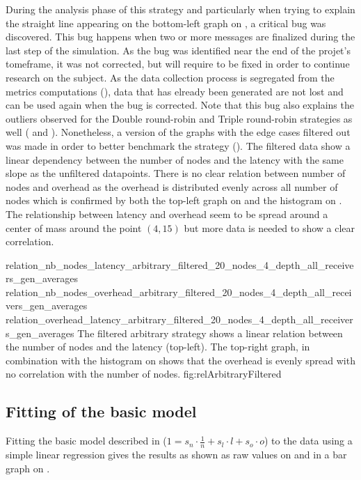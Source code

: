 During the analysis phase of this strategy and particularly when trying to
explain the straight line appearing on the bottom-left graph on
, a critical bug was discovered. This bug happens when two
or more messages are finalized during the last step of the simulation. As the
bug was identified near the end of the projet's tomeframe, it was not corrected,
but will require to be fixed in order to continue research on the subject. As
the data collection process is segregated from the metrics computations
(), data that has elready been generated are not
lost and can be used again when the bug is corrected. Note that this bug also
explains the outliers observed for the Double round-robin and Triple round-robin
strategies as well ( and ).
Nonetheless, a version of the graphs with the edge cases filtered out was made
in order to better benchmark the strategy ().
The filtered data show a linear dependency between the number of nodes and
the latency with the same slope as the unfiltered datapoints. There is no clear
relation between number of nodes and overhead as the overhead is distributed
evenly across all number of nodes which is confirmed by both the top-left graph
on  and the histogram on .
The relationship between latency and overhead seem to be spread around a center
of mass around the point \((4, 15)\) but more data is needed to show a clear
correlation.


\triplefigure
    {relation_nb_nodes_latency_arbitrary_filtered_20_nodes_4_depth_all_receivers_gen_averages}
    {relation_nb_nodes_overhead_arbitrary_filtered_20_nodes_4_depth_all_receivers_gen_averages}
    {relation_overhead_latency_arbitrary_filtered_20_nodes_4_depth_all_receivers_gen_averages}
    {The filtered arbitrary strategy shows a linear relation between the number of
    nodes and the latency (top-left). The top-right graph, in combination with
    the histogram on  shows that the overhead is evenly
    spread with no correlation with the number of nodes.}
    {fig:relArbitraryFiltered}


\FloatBarrier
\subsection{Fitting of the basic model}
\label{ssec:fittingBase}
Fitting the basic model described in  (\(1 = s_n \cdot
\frac{1}{n} + s_l\cdot l + s_o\cdot o\)) to the data using a simple linear
regression gives the results as shown as raw values on  and
in a bar graph on .


